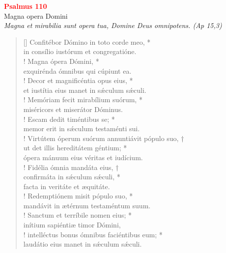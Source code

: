 
\def\greinitialformat#1{%
{\fontsize{39}{39}\selectfont #1}%
}




\vspace{0.3cm}
\begin{center}
 \textcolor{red}{\large \bf Psalmus 110}\\
Magna opera Domini\\
\textit{\small Magna et mirabilia sunt opera tua, Domine Deus omnipotens. (Ap 15,3)}
\end{center}
\begin{verse}[\versewidth]
Confitébor Dómino in toto corde meo, *\\
in consílio iustórum et congregatióne.\\!
\vin	Magna ópera Dómini, *\\
\vin  exquirénda ómnibus qui cúpiunt ea.\\!
Decor et magnificéntia opus eius, *\\
et iustítia eius manet in s\'{æ}culum s\'{æ}culi.\\!
\vin  Memóriam fecit mirabílium suórum, *\\
\vin  miséricors et miserátor Dóminus.\\!
Escam dedit timéntibus se; *\\
memor erit in s\'{æ}culum testaménti sui.\\!
\vin  Virtútem óperum \verselinebreak suórum annuntiávit pópulo suo, †\\
\vin  ut det illis hereditátem géntium; *\\
\vin  ópera mánuum eius véritas et iudícium.\\!
Fidélia ómnia mandáta eius, †\\
confirmáta in s\'{æ}culum s\'{æ}culi, *\\
facta in veritáte et æquitáte.\\!
\vin  Redemptiónem misit pópulo suo, *\\
\vin  mandávit in ætérnum testaméntum suum.\\!
Sanctum et terríbile nomen eius; *\\
inítium sapiéntiæ timor Dómini,\\!
\vin  intelléctus bonus ómnibus faciéntibus eum; *\\
\vin  laudátio eius manet in s\'{æ}culum s\'{æ}culi.\\
\end{verse}
\vspace{1cm}